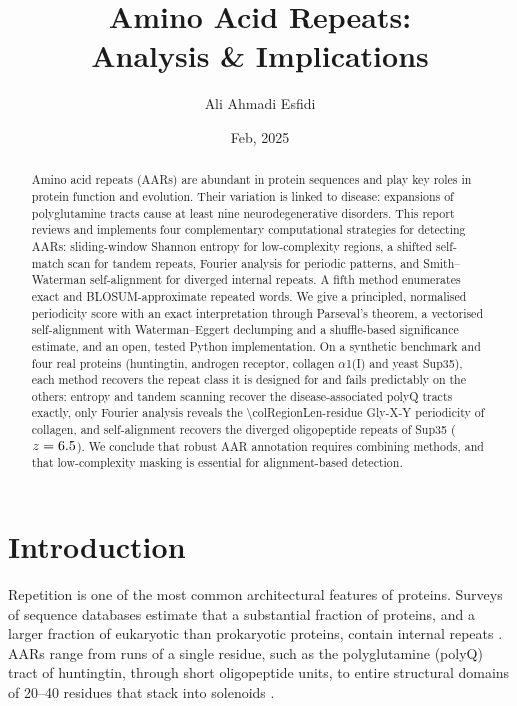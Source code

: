 \documentclass[11pt,a4paper]{article}
\title{\sffamily\bfseries Amino Acid Repeats:\\[0.2em]\Large Analysis \& Implications}
\author{Ali Ahmadi Esfidi}
\date{Feb, 2025}
\begin{document}
\maketitle

\begin{abstract}
\noindent Amino acid repeats (AARs) are abundant in protein sequences and play key roles in protein
function and evolution. Their variation is linked to disease: expansions of polyglutamine tracts
cause at least nine neurodegenerative disorders. This report reviews and implements four
complementary computational strategies for detecting AARs: sliding-window Shannon entropy
for low-complexity regions, a shifted self-match scan for tandem repeats, Fourier analysis
for periodic patterns, and Smith--Waterman self-alignment for diverged internal repeats.
A fifth method enumerates exact and BLOSUM-approximate repeated words.
We give a principled, normalised periodicity score with an exact interpretation through Parseval's theorem,
a vectorised self-alignment with Waterman--Eggert declumping and a shuffle-based significance estimate,
and an open, tested Python implementation. On a synthetic benchmark and four real proteins
(huntingtin, androgen receptor, collagen $\alpha$1(I) and yeast Sup35), each method recovers the
repeat class it is designed for and fails predictably on the others: entropy and tandem scanning
recover the disease-associated polyQ tracts exactly, only Fourier analysis
reveals the \num{\colRegionLen}-residue Gly-X-Y periodicity of collagen, and self-alignment
recovers the diverged oligopeptide repeats of Sup35 ($z=6.5$). We conclude that robust AAR annotation
requires combining methods, and that low-complexity masking is essential for alignment-based detection.
\end{abstract}

\section{Introduction}\label{sec:intro}

Repetition is one of the most common architectural features of proteins. Surveys of sequence
databases estimate that a substantial fraction of proteins, and a larger fraction of eukaryotic
than prokaryotic proteins, contain internal repeats \cite{marcotte1999census}. AARs range from
runs of a single residue, such as the polyglutamine (polyQ) tract of huntingtin, through short
oligopeptide units, to entire structural domains of 20--40 residues that stack into solenoids
\cite{andrade2001repeats,kajava2012tandem}.
\end{document}
